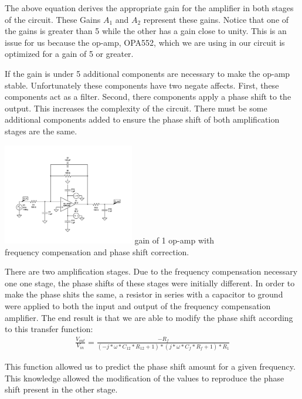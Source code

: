 \documentclass{article}	%
\begin{document}
\begin{multicols}{2}
The above equation derives the appropriate
gain for the amplifier in both stages
of the circuit.
These Gains $A_1$ and $A_2$ represent these gains.
Notice that one of the gains is greater than
5 while the other has a gain close to unity.
This is an issue for us because the op-amp,
OPA552, which we are using in our circuit is 
optimized for a gain of 5 or greater.

If the gain is under 5 additional components
are necessary to make the op-amp stable.
Unfortunately these components have two negate affects.
First, these components act as a filter.
Second, there components apply a phase shift to the output.
This increases the complexity of the circuit.
There must be some additional components added
to ensure the phase shift of both amplification stages are the same.

\begin{center}
\includegraphics[width=0.43\textwidth,keepaspectratio]{gain_one_552.pdf}
gain of 1 op-amp with\\ frequency compensation and phase shift correction.
\end{center}

There are two amplification stages.
Due to the frequency compensation necessary one one stage,
the phase shifts of these stages were initially different.
In order to make the phase shits the same,
a resistor in series with a capacitor to ground were applied
to both the input and output of the frequency compensation amplifier.
The end result is that we are able to modify the phase shift according
to this transfer function:
\begin{gather*}
\frac{V_{out}}{V_{in}} = \frac{-R_f}{(-j * \omega * C_{12} * R_{12} + 1)*(j * \omega * C_f * R_f + 1)*R_1}
\end{gather*}

This function allowed us to predict the phase shift amount for a given frequency.
This knowledge allowed the modification of the values to reproduce the
phase shift present in the other stage.


\end{multicols}
\end{document}

